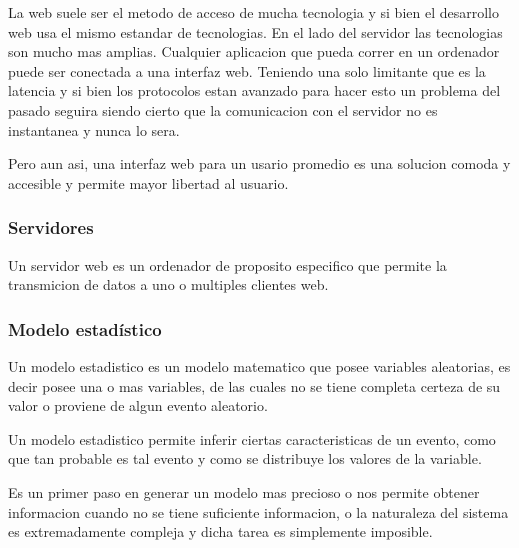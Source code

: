 La web suele ser el metodo de acceso de mucha tecnologia y si bien el
desarrollo web usa el mismo estandar de tecnologias. En el lado del servidor
las tecnologias son mucho mas amplias. Cualquier aplicacion que pueda correr
en un ordenador puede ser conectada a una interfaz web. Teniendo una solo
limitante que es la latencia y si bien los protocolos estan avanzado para hacer
esto un problema del pasado seguira siendo cierto que la comunicacion con el
servidor no es instantanea y nunca lo sera.

Pero aun asi, una interfaz web para un usario promedio es una solucion comoda y
accesible y permite mayor libertad al usuario.


\subsubsection*{Servidores}

Un servidor web es un ordenador de proposito especifico que permite la
transmicion de datos a uno o multiples clientes web.


\subsubsection{Modelo estadístico}

Un modelo estadistico es un modelo matematico que posee variables aleatorias,
es decir posee una o mas variables, de las cuales no se tiene completa certeza
de su valor o proviene de algun evento aleatorio.

Un modelo estadistico permite inferir ciertas caracteristicas de un evento,
como que tan probable es tal evento y como se distribuye los valores de la
variable.

Es un primer paso en generar un modelo mas precioso o nos permite obtener
informacion cuando no se tiene suficiente informacion, o la naturaleza del
sistema es extremadamente compleja y dicha tarea es simplemente imposible.
